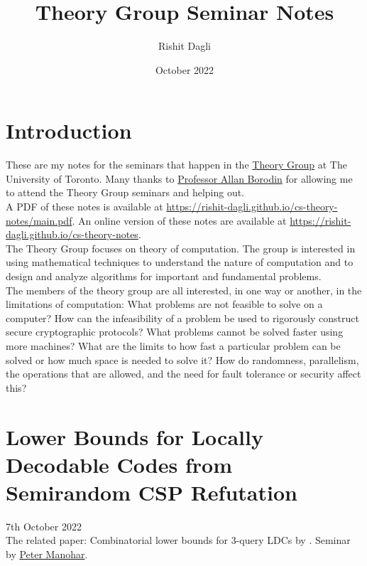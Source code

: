 \documentclass{article}
\title{Theory Group Seminar Notes}
\author{Rishit Dagli}
\date{October 2022}
\begin{document}
\maketitle

\tableofcontents
\clearpage

\section*{Introduction}

These are my notes for the seminars that happen in the \href{https://www.cs.toronto.edu/theory/}{Theory Group} at The University of Toronto. Many thanks to \href{http://www.cs.toronto.edu/~bor/}{Professor Allan Borodin} for allowing me to attend the Theory Group seminars and helping out.\\

A PDF of these notes is available at \url{https://rishit-dagli.github.io/cs-theory-notes/main.pdf}. An online version of these notes are available at \url{https://rishit-dagli.github.io/cs-theory-notes}.\\

The Theory Group focuses on theory of computation. The group is interested in using mathematical techniques to understand the nature of computation and to design and analyze algorithms for important and fundamental problems.\\

The members of the theory group are all interested, in one way or another, in the limitations of computation: What problems are not feasible to solve on a computer? How can the infeasibility of a problem be used to rigorously construct secure cryptographic protocols? What problems cannot be solved faster using more machines? What are the limits to how fast a particular problem can be solved or how much space is needed to solve it? How do randomness, parallelism, the operations that are allowed, and the need for fault tolerance or security affect this?

\newpage

\section{Lower Bounds for Locally Decodable Codes from Semirandom CSP Refutation}

7th October 2022\\

\noindent The related paper: Combinatorial lower bounds for 3-query LDCs by \citet{Alrabiah2022-ds}. Seminar by \href{https://www.cs.cmu.edu/~pmanohar/}{Peter Manohar}. \cite{https://doi.org/10.48550/arxiv.1911.10698} \cite{https://doi.org/10.48550/arxiv.2109.04415}
\end{document}
